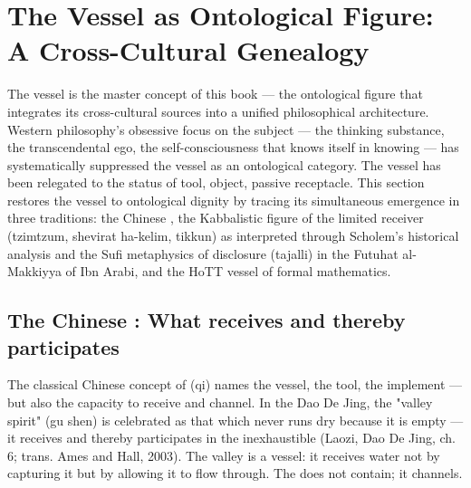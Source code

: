 \section{The Vessel as Ontological Figure: A Cross-Cultural Genealogy}

The vessel is the master concept of this book — the ontological figure that integrates its cross-cultural sources into a unified philosophical architecture. Western philosophy's obsessive focus on the subject — the thinking substance, the transcendental ego, the self-consciousness that knows itself in knowing — has systematically suppressed the vessel as an ontological category. The vessel has been relegated to the status of tool, object, passive receptacle. This section restores the vessel to ontological dignity by tracing its simultaneous emergence in three traditions: the Chinese , the Kabbalistic figure of the limited receiver (tzimtzum, shevirat ha-kelim, tikkun) as interpreted through Scholem's historical analysis and the Sufi metaphysics of disclosure (tajalli) in the Futuhat al-Makkiyya of Ibn Arabi, and the HoTT vessel of formal mathematics.

\subsection{The Chinese : What receives and thereby participates}

The classical Chinese concept of  (qi) names the vessel, the tool, the implement — but also the capacity to receive and channel. In the Dao De Jing, the "valley spirit" (gu shen) is celebrated as that which never runs dry because it is empty — it receives and thereby participates in the inexhaustible (Laozi, Dao De Jing, ch. 6; trans. Ames and Hall, 2003). The valley is a vessel: it receives water not by capturing it but by allowing it to flow through. The  does not contain; it channels.

